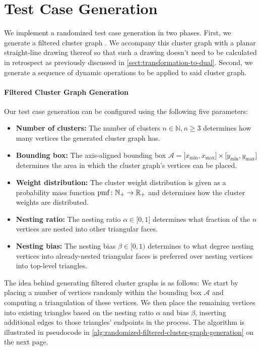 \section{Test Case Generation}
\label{sect:test-case-generation}

We implement a randomized test case generation in two phases.
First, we generate a filtered cluster graph \clustergraph{}.
We accompany this cluster graph with a planar straight-line drawing \clusterdrawing{} thereof so that such a drawing doesn't need to be calculated in retrospect as previously discussed in \cref{sect:transformation-to-dual}.
Second, we generate a sequence of dynamic operations to be applied to said cluster graph.

\paragraph{Filtered Cluster Graph Generation}

Our test case generation can be configured using the following five parameters:
%
\begin{itemize}
\item \textbf{Number of clusters:} The number of clusters $n \in \mathbb{N}, n \geq 3$ determines how many vertices the generated cluster graph \clustergraph{} has.
\item \textbf{Bounding box:} The axis-aligned bounding box $\mathcal{A} = \lbrack x_\text{min}, x_\text{max} \rbrack \times \lbrack y_\text{min}, y_\text{max} \rbrack$ determines the area in which the cluster graph's vertices can be placed.
\item \textbf{Weight distribution:} The cluster weight distribution is given as a probability mass function $\operatorname{pmf} \colon \mathbb{N}_+ \to \mathbb{R}_+$ and determines how the cluster weights are distributed.
\item \textbf{Nesting ratio:} The nesting ratio $\alpha \in \lbrack 0, 1 \rbrack$ determines what fraction of the $n$ vertices are nested into other triangular faces.
\item \textbf{Nesting bias:} The nesting bias $\beta \in \lbrack 0, 1 )$ determines to what degree nesting vertices into already-nested triangular faces is preferred over nesting vertices into top-level triangles.
\end{itemize}

The idea behind generating filtered cluster graphs \clustergraph{} is as follows:
We start by placing a number of vertices randomly within the bounding box $\mathcal{A}$ and computing a triangulation of these vertices.
We then place the remaining vertices into existing triangles based on the nesting ratio $\alpha$ and bias $\beta$, inserting additional edges to those triangles' endpoints in the process.
The algorithm is illustrated in pseudocode in \cref{alg:randomized-filtered-cluster-graph-generation} on the next page.

